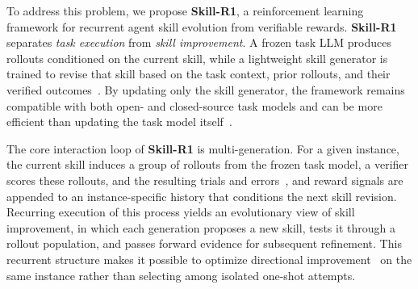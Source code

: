 To address this problem, we propose \textbf{Skill-R1}, a reinforcement learning framework for recurrent agent skill evolution from verifiable rewards. 
\textbf{Skill-R1} separates \emph{task execution} from \emph{skill improvement}. 
A frozen task LLM produces rollouts conditioned on the current skill, 
while a lightweight skill generator is trained to revise that skill based on the task context, prior rollouts, and their verified outcomes~\citep{xia2025knowledgequery,wang2025dice,vannguyen2025smallsurvey}. 
By updating only the skill generator, the framework remains compatible with both open- and closed-source task models and can be more efficient than updating the task model itself~\citep{vannguyen2025smallsurvey,xia2025surveyactive}.

The core interaction loop of \textbf{Skill-R1} is multi-generation. 
For a given instance, the current skill induces a group of rollouts from the frozen task model, a verifier scores these rollouts, and the resulting trials and errors~\citep{wu2025ocean, wu2024decot},
and reward signals are appended to an instance-specific history that conditions the next skill revision. 
Recurring execution of this process yields an evolutionary view of skill improvement, in which each generation proposes a new skill, 
tests it through a rollout population, and passes forward evidence for subsequent refinement.
This recurrent structure makes it possible to optimize directional improvement~\citep{xia2026skillrl,sun2025seagent,zhou2025memento} on the same instance rather than selecting among isolated one-shot attempts.

